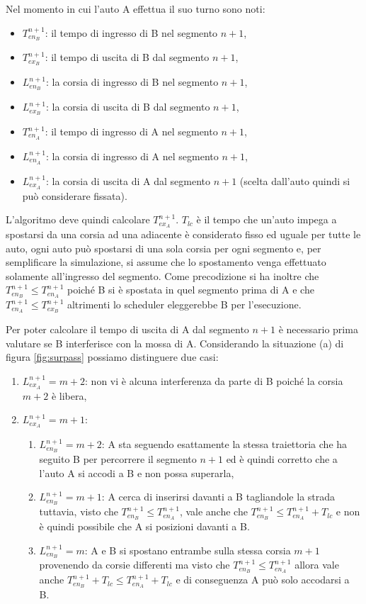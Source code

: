 \documentclass[11pt,a4paper]{report}
\begin{document}
Nel momento in cui l'auto A effettua il suo turno sono noti:
\begin{itemize}
\item $T_{en_B}^{n+1}$: il tempo di ingresso di B nel segmento $n+1$,
\item $T_{ex_B}^{n+1}$: il tempo di uscita di B dal segmento $n+1$,
\item $L_{en_B}^{n+1}$: la corsia di ingresso di B nel segmento $n+1$,
\item $L_{ex_B}^{n+1}$: la corsia di uscita di B dal segmento $n+1$,
\item $T_{en_A}^{n+1}$: il tempo di ingresso di A nel segmento $n+1$,
\item $L_{en_A}^{n+1}$: la corsia di ingresso di A nel segmento $n+1$,
\item $L_{ex_A}^{n+1}$: la corsia di uscita di A dal segmento $n+1$ (scelta dall'auto quindi si può considerare fissata).
\end{itemize}
L'algoritmo deve quindi calcolare $T_{ex_A}^{n+1}$.
$T_{lc}$ è il tempo che un'auto impega a spostarsi da una corsia ad una adiacente è considerato fisso ed uguale per tutte le auto, ogni auto può spostarsi di una sola corsia per ogni segmento e, per semplificare la simulazione, si assume che lo spostamento venga effettuato solamente all'ingresso del segmento.
Come precodizione si ha inoltre che $T_{en_B}^{n+1} \leq T_{en_A}^{n+1}$ poiché B si è spostata in quel segmento prima di A e che $T_{en_A}^{n+1} \leq T_{ex_B}^{n+1}$ altrimenti lo scheduler eleggerebbe B per l'esecuzione.

Per poter calcolare il tempo di uscita di A dal segmento $n+1$ è necessario prima valutare se B interferisce con la mossa di A.
Considerando la situazione (a) di figura \ref{fig:surpass} possiamo distinguere due casi:
\begin{enumerate}
\item $L_{ex_A}^{n+1} = m+2$: non vi è alcuna interferenza da parte di B poiché la corsia $m+2$ è libera,
\item $L_{ex_A}^{n+1} = m+1$:
  \begin{enumerate}
  \item $L_{en_B}^{n+1} = m+2$: A sta seguendo esattamente la stessa traiettoria che ha seguito B per percorrere il segmento $n+1$ ed è quindi corretto che a l'auto A si accodi a B e non possa superarla,
  \item $L_{en_B}^{n+1} = m+1$: A cerca di inserirsi davanti a B tagliandole la strada tuttavia, visto che $T_{en_B}^{n+1} \leq T_{en_A}^{n+1}$, vale anche che $T_{en_B}^{n+1} \leq T_{en_A}^{n+1} + T_{lc}$ e non è quindi possibile che A si posizioni davanti a B.
  \item $L_{en_B}^{n+1} = m$: A e B si spostano entrambe sulla stessa corsia $m+1$ provenendo da corsie differenti ma visto che $T_{en_B}^{n+1} \leq T_{en_A}^{n+1}$ allora vale anche $T_{en_B}^{n+1} + T_{lc} \leq T_{en_A}^{n+1} + T_{lc}$ e di conseguenza A può solo accodarsi a B.
  \end{enumerate}
\end{enumerate}
\end{document}
